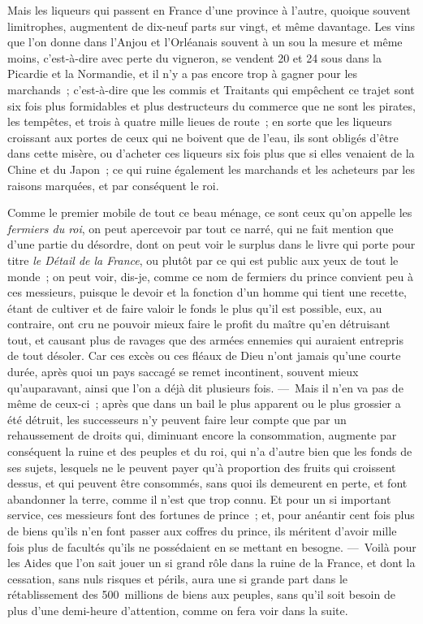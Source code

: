 \documentclass[french,twoside]{book} %
\begin{document}
Mais les liqueurs qui passent en France d’une province à l’autre, quoique souvent limitrophes, augmentent de dix-neuf parts sur vingt, et même davantage. Les vins que l’on donne dans l’Anjou et l’Orléanais souvent à un sou la mesure et même moins, c’est-à-dire avec perte du vigneron, se vendent 20 et 24 sous dans la Picardie et la Normandie, et il n’y a pas encore trop à gagner pour les marchands ; c’est-à-dire que les commis et Traitants qui empêchent ce trajet sont six fois plus formidables et plus destructeurs du commerce que ne sont les pirates, les tempêtes, et trois à quatre mille lieues de route ; en sorte que les liqueurs croissant aux portes de ceux qui ne boivent que de l’eau, ils sont obligés d’être dans cette misère, ou d’acheter ces liqueurs six fois plus que si elles venaient de la Chine et du Japon ; ce qui ruine également les marchands et les acheteurs par les raisons marquées, et par conséquent le roi.\par
Comme le premier mobile de tout ce beau ménage, ce sont ceux qu’on appelle les {\itshape fermiers du roi}, on peut apercevoir par tout ce narré, qui ne fait mention que d’une partie du désordre, dont on peut voir le surplus dans le livre qui porte pour titre {\itshape le Détail de la France}, ou plutôt par ce qui est public aux yeux de tout le monde ; on peut voir, dis-je, comme ce nom de fermiers du prince convient peu à ces messieurs, puisque le devoir et la fonction d’un homme qui tient une recette, étant de cultiver et de faire valoir le fonds le plus qu’il est possible, eux, au contraire, ont cru ne pouvoir mieux faire le profit du maître qu’en détruisant tout, et causant plus de ravages que des armées ennemies qui auraient entrepris de tout désoler. Car ces excès ou ces fléaux de Dieu n’ont jamais qu’une courte durée, après quoi un pays saccagé se remet incontinent, souvent mieux qu’auparavant, ainsi que l’on a déjà dit plusieurs fois. — Mais il n’en va pas de même de ceux-ci ; après que dans un bail le plus apparent ou le plus grossier a été détruit, les successeurs n’y peuvent faire leur compte que par un rehaussement de droits qui, diminuant encore la consommation, augmente par conséquent la ruine et des peuples et du roi, qui n’a d’autre bien que les fonds de ses sujets, lesquels ne le peuvent payer qu’à proportion des fruits qui croissent dessus, et qui peuvent être consommés, sans quoi ils demeurent en perte, et font abandonner la terre, comme il n’est que trop connu. Et pour un si important service, ces messieurs font des fortunes de prince ; et, pour anéantir cent fois plus de biens qu’ils n’en font passer aux coffres du prince, ils méritent d’avoir mille fois plus de facultés qu’ils ne possédaient en se mettant en besogne. — Voilà pour les Aides que l’on sait jouer un si grand rôle dans la ruine de la France, et dont la cessation, sans nuls risques et périls, aura une si grande part dans le rétablissement des 500 millions de biens aux peuples, sans qu’il soit besoin de plus d’une demi-heure d’attention, comme on fera voir dans la suite.\par
\end{document}
